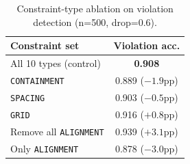 \documentclass[11pt, letterpaper]{article}
\begin{document}
\begin{table}[htbp]
\caption{Constraint-type ablation on violation detection (n=500, drop=0.6).}
\label{tab:ablation}
\centering
\begin{tabularx}{\textwidth}{Xc}
\toprule
\textbf{Constraint set} & \textbf{Violation acc.} \\
\midrule
All 10 types (control) & \textbf{0.908} \\
\texttt{CONTAINMENT} & 0.889 ($-1.9$pp) \\
\texttt{SPACING} & 0.903 ($-0.5$pp) \\
\texttt{GRID} & 0.916 ($+0.8$pp) \\
Remove all \texttt{ALIGNMENT} & 0.939 ($+3.1$pp) \\
Only \texttt{ALIGNMENT} & 0.878 ($-3.0$pp) \\
\bottomrule
\end{tabularx}
\end{table}
\end{document}
